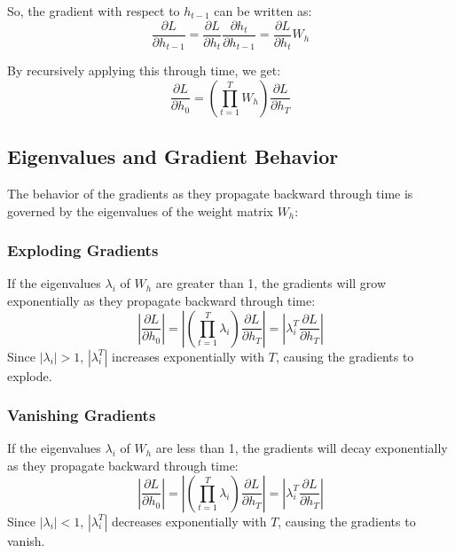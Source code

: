 \documentclass{article}
\begin{document}
So, the gradient with respect to \( h_{t-1} \) can be written as:
\begin{equation}
\frac{\partial L}{\partial h_{t-1}} = \frac{\partial L}{\partial h_t} \frac{\partial h_t}{\partial h_{t-1}} = \frac{\partial L}{\partial h_t} W_h
\end{equation}

By recursively applying this through time, we get:
\begin{equation}
\frac{\partial L}{\partial h_0} = \left( \prod_{t=1}^{T} W_h \right) \frac{\partial L}{\partial h_T}
\end{equation}

\subsection*{Eigenvalues and Gradient Behavior}

The behavior of the gradients as they propagate backward through time is governed by the eigenvalues of the weight matrix \( W_h \):

\subsubsection*{Exploding Gradients}
If the eigenvalues \( \lambda_i \) of \( W_h \) are greater than 1, the gradients will grow exponentially as they propagate backward through time:
\begin{equation}
\left| \frac{\partial L}{\partial h_0} \right| = \left| \left( \prod_{t=1}^{T} \lambda_i \right) \frac{\partial L}{\partial h_T} \right| = \left| \lambda_i^T \frac{\partial L}{\partial h_T} \right|
\end{equation}
Since \( |\lambda_i| > 1 \), \( |\lambda_i^T| \) increases exponentially with \( T \), causing the gradients to explode.

\subsubsection*{Vanishing Gradients}
If the eigenvalues \( \lambda_i \) of \( W_h \) are less than 1, the gradients will decay exponentially as they propagate backward through time:
\begin{equation}
\left| \frac{\partial L}{\partial h_0} \right| = \left| \left( \prod_{t=1}^{T} \lambda_i \right) \frac{\partial L}{\partial h_T} \right| = \left| \lambda_i^T \frac{\partial L}{\partial h_T} \right|
\end{equation}
Since \( |\lambda_i| < 1 \), \( |\lambda_i^T| \) decreases exponentially with \( T \), causing the gradients to vanish.
\end{document}
